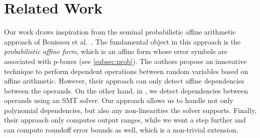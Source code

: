 \section{Related Work}
\label{sec:related-work}

Our work draws inspiration from the seminal probabilistic affine arithmetic
approach of Bouissou et al.~\cite{bouissou2012generalization}.
%
The fundamental object in this approach is the \emph{probabilistic affine
form}, which is an affine form whose error symbols are associated with p-boxes
(see \cref{subsec:prob}).
%
The authors propose an innovative technique to perform dependent operations
between random variables based on affine arithmetic. 
%
However, their approach can only detect affine dependencies between the
operands.
%
%
On the other hand, in \Tool, we detect dependencies between operands using an SMT solver. 
%
Our approach allows us to handle not only polynomial dependencies, but also any non-linearities the solver supports.
%
%
%
%
Finally, their approach only computes output ranges, while we went a step
further and can compute roundoff error bounds as well, which is a non-trivial
extension.


